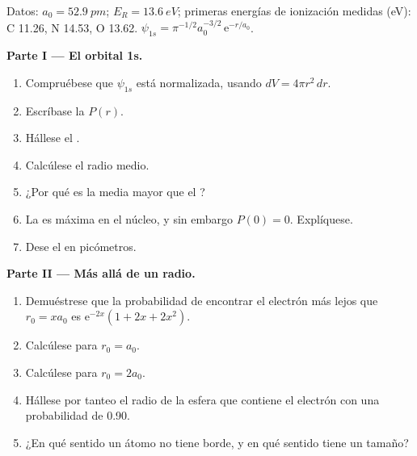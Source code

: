 \begin{problem}
\label{pb:b2:atomic-orbitals:1}
Datos: $a_0 = \qty{52.9}{pm}$; $E_R = \qty{13.6}{eV}$; primeras energías de ionización
medidas (\unit{eV}): C 11.26, N 14.53, O 13.62. $\psi_{1s} = \pi^{-1/2}a_0^{-3/2}\,
\mathrm e^{-r/a_0}$.

\medskip
\noindent\textbf{Parte I --- El orbital 1s.}
\begin{enumerate}
  \item Compruébese que $\psi_{1s}$ está normalizada, usando $dV = 4\pi r^2\,dr$.
  \item Escríbase la  $P(r)$.
  \item Hállese el .
  \item Calcúlese el radio medio.
  \item ¿Por qué es la media mayor que el ?
  \item La  es máxima en el núcleo, y sin embargo $P(0) = 0$.
        Explíquese.
  \item Dese el  en picómetros.
\end{enumerate}

\medskip
\noindent\textbf{Parte II --- Más allá de un radio.}
\begin{enumerate}[resume]
  \item Demuéstrese que la probabilidad de encontrar el electrón más lejos que $r_0 =
        xa_0$ es $\mathrm e^{-2x}(1 + 2x + 2x^2)$.
  \item Calcúlese para $r_0 = a_0$.
  \item Calcúlese para $r_0 = 2a_0$.
  \item Hállese por tanteo el radio de la esfera que contiene el electrón con una
        probabilidad de 0.90.
  \item ¿En qué sentido un átomo no tiene borde, y en qué sentido tiene un tamaño?
\end{enumerate}


\end{problem}
